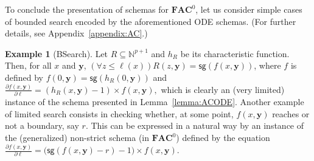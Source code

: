\documentclass[11pt, oneside]{article}
\newcommand{\fun}[1]{\mathsf{#1}}
\newcommand{\Nat}{\mathbb{N}}
\newcommand{\AC}{\mathbf{FAC}}
\newcommand{\tu}[1]{\mathbf{#1}}
\theoremstyle{definition}
\newtheorem{example}{Example}
\begin{document}
To conclude the presentation of schemas for $\AC^0$, let us consider simple cases of bounded search encoded by the aforementioned ODE schemas.
(For further details, see Appendix~\ref{appendix:AC}.)


\begin{example}[BSearch]
    Let $R\subseteq \Nat^{p+1}$ and $h_R$ be its characteristic function.
    Then, for all $x$ and $\tu y$, 
    $(\forall z \leq \ell(x))R(z,\tu y)= \fun{sg}(f(x, \tu y))$,
    where $f$ is defined by $f(0, \tu y)= \fun{sg}(h_R(0, \tu y))$
    and
    $
    \frac{\partial f(x, \tu y)}{\partial \ell} = (h_R(x, \tu y) -1) \times f(x, \tu y),
    $
    which is clearly an (very limited) instance of the schema presented in Lemma~\ref{lemma:ACODE}.
    Another example of limited search consists in checking whether, at some point, $f(x, \tu y)$ reaches or not a boundary, say $r$.
    This can be expressed in a natural way by an instance of the (generalized) non-strict schema (in $\AC^0$) defined by the equation $\frac{\partial f(x, \tu y)}{\partial \ell} = \big(\fun{sg}(f(x, \tu y)-r)-1\big)\times f(x, \tu y)$.
\end{example}
\end{document}
